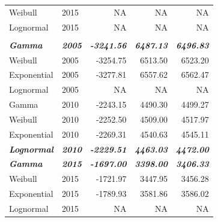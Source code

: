 \documentclass[
11pt, %
oneside, %
english, %
singlespacing, %
]{macthesis} %
\begin{document}
\begin{table}
\begin{tabular}[t]{llrrr}
\hspace{1em}Weibull & 2015 & NA & NA & NA\\
\hspace{1em}Lognormal & 2015 & NA & NA & \vphantom{1} NA\\
\addlinespace[0.3em]
\multicolumn{5}{l}{\textbf{Destination: Outdoors }}\\
\begingroup\fontsize{10}{12}\selectfont \em{\textbf{\hspace{1em}Gamma}}\endgroup & \begingroup\fontsize{10}{12}\selectfont \em{\textbf{2005}}\endgroup & \begingroup\fontsize{10}{12}\selectfont \em{\textbf{-3241.56}}\endgroup & \begingroup\fontsize{10}{12}\selectfont \em{\textbf{6487.13}}\endgroup & \begingroup\fontsize{10}{12}\selectfont \em{\textbf{6496.83}}\endgroup\\
\hspace{1em}Weibull & 2005 & -3254.75 & 6513.50 & 6523.20\\
\hspace{1em}Exponential & 2005 & -3277.81 & 6557.62 & 6562.47\\
\hspace{1em}Lognormal & 2005 & NA & NA & NA\\
\hspace{1em}Gamma & 2010 & -2243.15 & 4490.30 & 4499.27\\
\hspace{1em}Weibull & 2010 & -2252.50 & 4509.00 & 4517.97\\
\hspace{1em}Exponential & 2010 & -2269.31 & 4540.63 & 4545.11\\
\begingroup\fontsize{10}{12}\selectfont \em{\textbf{\hspace{1em}Lognormal}}\endgroup & \begingroup\fontsize{10}{12}\selectfont \em{\textbf{2010}}\endgroup & \begingroup\fontsize{10}{12}\selectfont \em{\textbf{-2229.51}}\endgroup & \begingroup\fontsize{10}{12}\selectfont \em{\textbf{4463.03}}\endgroup & \begingroup\fontsize{10}{12}\selectfont \em{\textbf{4472.00}}\endgroup\\
\begingroup\fontsize{10}{12}\selectfont \em{\textbf{\hspace{1em}Gamma}}\endgroup & \begingroup\fontsize{10}{12}\selectfont \em{\textbf{2015}}\endgroup & \begingroup\fontsize{10}{12}\selectfont \em{\textbf{-1697.00}}\endgroup & \begingroup\fontsize{10}{12}\selectfont \em{\textbf{3398.00}}\endgroup & \begingroup\fontsize{10}{12}\selectfont \em{\textbf{3406.33}}\endgroup\\
\hspace{1em}Weibull & 2015 & -1721.97 & 3447.95 & 3456.28\\
\hspace{1em}Exponential & 2015 & -1789.93 & 3581.86 & 3586.02\\
\hspace{1em}Lognormal & 2015 & NA & NA & NA\\
\bottomrule
\end{tabular}
\end{table}
\end{document}
